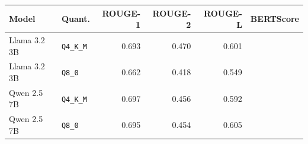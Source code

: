 \begin{tabular}{llrrrr}
\toprule
Model & Quant. & ROUGE-1 & ROUGE-2 & ROUGE-L & BERTScore \\
\midrule
Llama 3.2 3B & \texttt{Q4\_K\_M} & 0.693 & 0.470 & 0.601 & \tbd{} \\
Llama 3.2 3B & \texttt{Q8\_0} & 0.662 & 0.418 & 0.549 & \tbd{} \\
Qwen 2.5 7B & \texttt{Q4\_K\_M} & 0.697 & 0.456 & 0.592 & \tbd{} \\
Qwen 2.5 7B & \texttt{Q8\_0} & 0.695 & 0.454 & 0.605 & \tbd{} \\
\bottomrule
\end{tabular}
